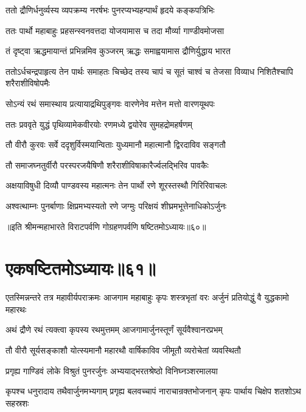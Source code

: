 \twolineshloka
{ततो द्रौणिर्धनुर्व्यस्य व्यपक्रम्य नरर्षभः}
{पुनरप्यभ्यहन्पार्थं हृदये कङ्कपत्रिभिः}



\twolineshloka
{ततः पार्थो महाबाहुः प्रहसन्स्वनवत्तदा}
{योजयामास च तदा मौर्व्या गाण्डीवमोजसा}


\twolineshloka
{तं दृष्ट्वा ऋद्धमायान्तं प्रभिन्नमिव कुञ्जरम्}
{ऋद्धः समाह्वयामास द्रौणिर्युद्धाय भारत}


\threelineshloka
{ततोऽर्धचन्द्रपाहृत्य तेन पार्थः समाहतः}
{चिच्छेद तस्य चापं च सूतं चाश्वं च तेजसा}
{विव्याध निशितैश्चापि शरैराशीविषोपमैः}


\twolineshloka
{सोऽन्यं रथं समास्थाय प्रत्यायाद्रथिपुङ्गवः}
{वारणेनेव मत्तेन मत्तो वारणयूथपः}


\twolineshloka
{ततः प्रववृते युद्धं पृथिव्यामेकवीरयोः}
{रणमध्ये द्वयोरेव सुमहद्रोमहर्षणम्}


\twolineshloka
{तौ वीरौ कुरवः सर्वे ददृशुर्विस्मयान्विताः}
{युध्यमानौ महात्मानौ द्विरदाविव सङ्गतौ}


\twolineshloka
{तौ समाजघ्नतुर्वीरौ परस्परजयैषिणौ}
{शरैराशीविषाकारैर्ज्वलद्भिरिव पावकैः}


\twolineshloka
{अक्षयाविषुधी दिव्यौ पाण्डवस्य महात्मनः}
{तेन पार्थो रणे शूरस्तस्थौ गिरिरिवाचलः}


\twolineshloka
{अश्वत्थाम्नः पुनर्बाणाः क्षिप्रमभ्यस्यतो रणे}
{जग्मुः परिक्षयं शीघ्रमभूत्तेनाधिकोऽर्जुनः}

॥इति श्रीमन्महाभारते विराटपर्वणि गोग्रहणपर्वणि षष्टितमोऽध्यायः॥६०॥

\chapter{एकषष्टितमोऽध्यायः॥६१॥}

\threelineshloka
{एतस्मिन्नन्तरे तत्र महावीर्यपराक्रमः}
{आजगाम महाबाहुः कृपः शस्त्रभृतां वरः}
{अर्जुनं प्रतियोद्धुं वै युद्धकामो महारथः}


\twolineshloka
{अथं द्रौणे रथं त्यक्त्वा कृपस्य रथमुत्तमम्}
{आजगामार्जुनस्तूर्णं सूर्यवैश्वानरप्रभम्}


\twolineshloka
{तौ वीरौ सूर्यसङ्काशौ योत्स्यमानौ महारथौ}
{वार्षिकाविव जीमूतौ व्यरोचेतां व्यवस्थितौ}


\twolineshloka
{प्रगृह्य गाण्डिवं लोके विश्रुतं पुनरर्जुनः}
{अभ्ययाद्भरतश्रेष्ठो विनिघ्नञ्शरमालया}


\onelineshloka
{कृपश्च धनुरादाय तथैवार्जुनमभ्यगाम्}
\twolineshloka
{प्रगृह्य बलवच्चापं नाराचान्रक्तभोजनान्}
{कृपः पार्थाय चिक्षेप शतशोऽथ सहस्रशः}


